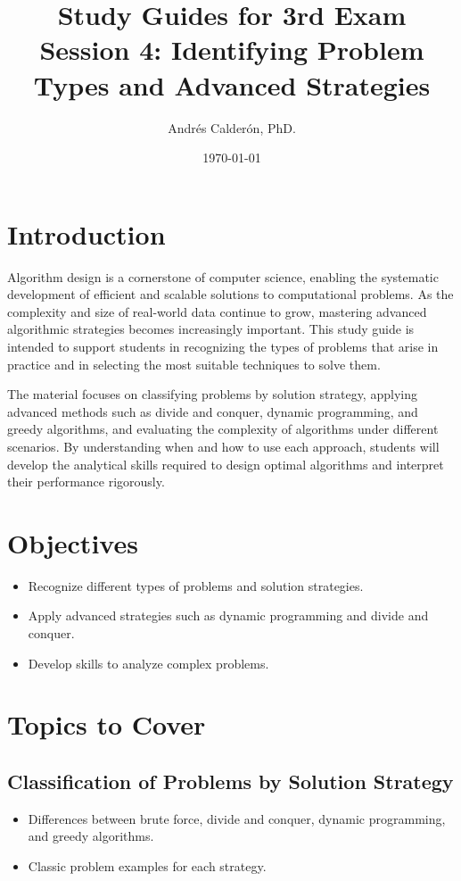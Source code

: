 \documentclass[12pt]{article}
\title{Study Guides for 3rd Exam \\
Session 4: Identifying Problem Types and Advanced Strategies
}
\author{Andrés Calderón, PhD.}
\date{\today}
\begin{document}
\maketitle

\section*{Introduction}
Algorithm design is a cornerstone of computer science, enabling the systematic development of efficient and scalable solutions to computational problems. As the complexity and size of real-world data continue to grow, mastering advanced algorithmic strategies becomes increasingly important. This study guide is intended to support students in recognizing the types of problems that arise in practice and in selecting the most suitable techniques to solve them.

The material focuses on classifying problems by solution strategy, applying advanced methods such as divide and conquer, dynamic programming, and greedy algorithms, and evaluating the complexity of algorithms under different scenarios. By understanding when and how to use each approach, students will develop the analytical skills required to design optimal algorithms and interpret their performance rigorously.

\section*{Objectives}
\begin{itemize}
    \item Recognize different types of problems and solution strategies.
    \item Apply advanced strategies such as dynamic programming and divide and conquer.
    \item Develop skills to analyze complex problems.
\end{itemize}

\section*{Topics to Cover}
\subsection*{Classification of Problems by Solution Strategy}
\begin{itemize}
    \item Differences between brute force, divide and conquer, dynamic programming, and greedy algorithms.
    \item Classic problem examples for each strategy.
\end{itemize}
\end{document}
